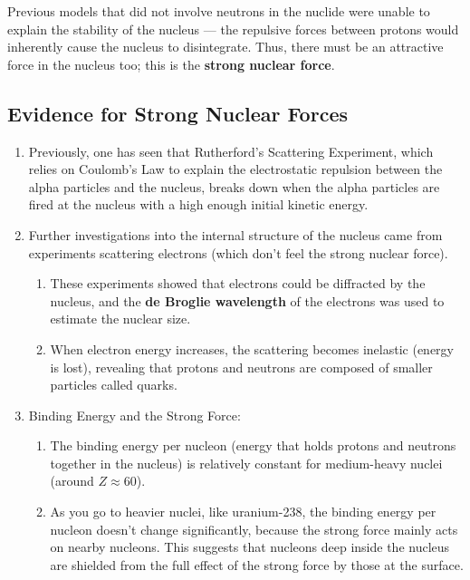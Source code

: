 \documentclass[a4paper,12pt]{article}
\begin{document}
Previous models that did not involve neutrons in the nuclide were unable to explain the stability of the nucleus --- the repulsive forces between protons would inherently cause the nucleus to disintegrate. Thus, there must be an attractive force in the nucleus too; this is the \textbf{strong nuclear force}.

\subsection{Evidence for Strong Nuclear Forces}

\begin{enumerate}
  \item Previously, one has seen that Rutherford's Scattering Experiment, which relies on Coulomb's Law to explain the electrostatic repulsion between the alpha particles and the nucleus, breaks down when the alpha particles are fired at the nucleus with a high enough initial kinetic energy.
  \item Further investigations into the internal structure of the nucleus came from experiments scattering electrons (which don't feel the strong nuclear force).
        \begin{enumerate}
          \item These experiments showed that electrons could be diffracted by the nucleus, and the \textbf{de Broglie wavelength} of the electrons was used to estimate the nuclear size.
          \item When electron energy increases, the scattering becomes inelastic (energy is lost), revealing that protons and neutrons are composed of smaller particles called quarks.
        \end{enumerate}
  \item Binding Energy and the Strong Force:
        \begin{enumerate}
          \item The binding energy per nucleon (energy that holds protons and neutrons together in the nucleus) is relatively constant for medium-heavy nuclei (around $Z \approx 60$).
          \item As you go to heavier nuclei, like uranium-238, the binding energy per nucleon doesn't change significantly, because the strong force mainly acts on nearby nucleons. This suggests that nucleons deep inside the nucleus are shielded from the full effect of the strong force by those at the surface.
        \end{enumerate}
\end{enumerate}
\end{document}
